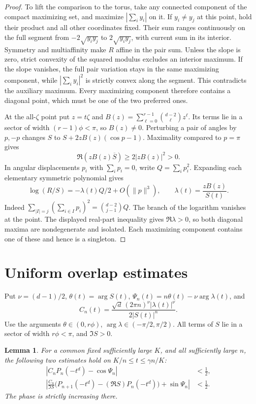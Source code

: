 \documentclass[11pt]{article}
\newtheorem{lemma}{Lemma}
\DeclareMathOperator{\Arg}{arg}
\begin{document}
\begin{proof}
To lift the comparison to the torus, take any connected
component of the compact maximizing set, and maximize
\(|\sum_i y_i|\) on it. If \(y_i\ne y_j\) at this point,
hold their product and all other coordinates fixed. Their
sum ranges continuously on the full segment from
\(-2\sqrt{y_i y_j}\) to \(2\sqrt{y_i y_j}\), with current
sum in its interior. Symmetry and multiaffinity make \(R\)
affine in the pair sum. Unless the slope is zero, strict
convexity of the squared modulus excludes an interior
maximum. If the slope vanishes, the full pair variation
stays in the same maximizing component, while
\(|\sum_i y_i|^2\) is strictly convex along the segment.
This contradicts the auxiliary maximum. Every maximizing
component therefore contains a diagonal point, which must
be one of the two preferred ones.

At the all-\(\zeta\) point put \(z=t\zeta\) and
\(B(z)=\sum_{\ell=0}^{r-1}\binom{d-2}{\ell}z^\ell\).
Its terms lie in a sector of width \((r-1)\phi<\pi\), so
\(B(z)\ne0\). Perturbing a pair of angles by \(p,-p\)
changes \(S\) to \(S+2zB(z)(\cos p-1)\).
Maximality compared to \(p=\pi\) gives
\[
\Re(zB(z)\overline S)\ge 2|zB(z)|^2>0.
\]
In angular displacements \(p_i\) with \(\sum_i p_i=0\),
write \(Q=\sum_i p_i^2\). Expanding each elementary
symmetric polynomial gives
\begin{equation}\label{eq:quadratic}
\log(R/S)=-\lambda(t)Q/2+O(\|p\|^3),
 \qquad \lambda(t)=\frac{zB(z)}{S(t)}.
\end{equation}
Indeed \(\sum_{|I|=j}(\sum_{i\in I}p_i)^2
=\binom{d-2}{j-1}Q\). The branch of the logarithm
vanishes at the point. The displayed real-part inequality
gives \(\Re\lambda>0\), so both diagonal maxima are
nondegenerate and isolated. Each maximizing component
contains one of these and hence is a singleton.
\end{proof}

\section{Uniform overlap estimates}

Put \(\nu=(d-1)/2\),
\(\theta(t)=\Arg S(t)\),
\(\Psi_n(t)=n\theta(t)-\nu\Arg\lambda(t)\), and
\[
C_n(t)=\frac{\sqrt d\,(2\pi n)^\nu|\lambda(t)|^\nu}{2|S(t)|^n}.
\]
Use the arguments \(\theta\in(0,r\phi)\),
\(\Arg\lambda\in(-\pi/2,\pi/2)\).
All terms of \(S\) lie in a sector of width \(r\phi<\pi\),
and \(\Im S>0\).

\begin{lemma}\label{lem:overlap}
For a common fixed sufficiently large \(K\), and all sufficiently
large \(n\), the following two estimates hold on
\(K/n\le t\le\gamma n/K\):
\begin{align}
 |C_n P_n(-t^d)-\cos\Psi_n|&<\tfrac12,\label{eq:sign}\\
 \left|\frac{C_n}{\Im S}
 \big(P_{n+1}(-t^d)-(\Re S)P_n(-t^d)\big)+\sin\Psi_n\right|
 &<\tfrac12.\label{eq:sw}
\end{align}
The phase is strictly increasing there.
\end{lemma}
\end{document}
